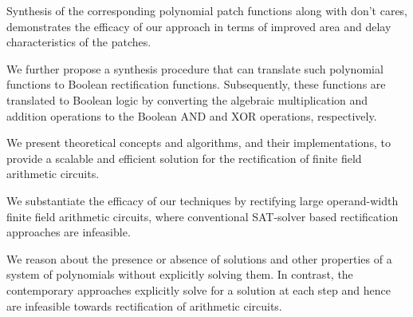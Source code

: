    \item Synthesis of the corresponding polynomial patch functions along with don't cares, demonstrates the efficacy of our approach in terms of improved area and delay characteristics of the patches.

\ei
\ei

\item  We further propose a synthesis
procedure that can translate such polynomial functions to Boolean rectification 
functions. Subsequently, these functions are translated to Boolean logic by converting the algebraic multiplication and addition operations to the Boolean AND and XOR operations, respectively.

\item We present theoretical concepts and algorithms, and their implementations, 
to provide a scalable and efficient solution for the rectification of finite field arithmetic circuits.

\item We substantiate the efficacy of our techniques by rectifying 
large operand-width finite field arithmetic circuits, where conventional SAT-solver based 
rectification approaches are infeasible.
\bi

\item We reason about the presence or absence of solutions and other properties of a system of polynomials without explicitly solving them. 
In contrast, the contemporary approaches explicitly solve for a solution at each step and hence are infeasible towards rectification of arithmetic circuits.
\ei

 
\ei







